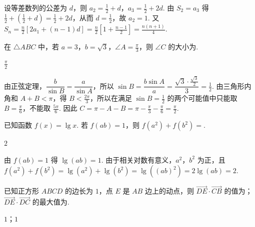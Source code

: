 \begin{solution}
设等差数列的公差为 \(d\)，则 \(a_2=\frac{1}{2}+d\)，\(a_3=\frac{1}{2}+2d\). 由 \(S_2=a_3\) 得
\(\frac{1}{2}+\left(\frac{1}{2}+d\right)=\frac{1}{2}+2d\)，从而 \(d=\frac{1}{2}\)，故 \(a_2=1\). 又
\(S_n=\frac{n}{2}\left[2a_1+(n-1)d\right]=\frac{n}{2}\left[1+\frac{n-1}{2}\right]=\frac{n(n+1)}{4}\).
\end{solution}

\begin{problem}
在 \(\triangle ABC\) 中，若 \(a = 3\)，\(b = \sqrt{3}\)，\(\angle A = \frac{\pi}{3}\)，则 \(\angle C\) 的大小为\fillinblank{}.
\end{problem}

\begin{answer}
\(\frac{\pi}{2}\)
\end{answer}

\begin{solution}
由正弦定理，\(\dfrac{b}{\sin B}=\dfrac{a}{\sin A}\)，所以
\(\sin B=\dfrac{b\sin A}{a}=\dfrac{\sqrt{3}\cdot\frac{\sqrt{3}}{2}}{3}=\frac{1}{2}\).
由三角形内角和 \(A+B<\pi\)，得 \(B<\frac{2\pi}{3}\)，所以在满足 \(\sin B=\frac{1}{2}\) 的两个可能值中只能取 \(B=\frac{\pi}{6}\)，不能取 \(\frac{5\pi}{6}\). 因此
\(C=\pi-A-B=\pi-\frac{\pi}{3}-\frac{\pi}{6}=\frac{\pi}{2}\).
\end{solution}

\begin{problem}
已知函数 \(f(x) = \lg x\). 若 \(f(ab) = 1\)，则 \(f(a^2) + f(b^2)=\)\fillinblank{}.
\end{problem}

\begin{answer}
\(2\)
\end{answer}

\begin{solution}
由 \(f(ab)=1\) 得 \(\lg(ab)=1\). 由于相关对数有意义，\(a^2\)，\(b^2\) 为正，且
\(f(a^2)+f(b^2)=\lg(a^2)+\lg(b^2)=\lg\left((ab)^2\right)=2\lg(ab)=2\).
\end{solution}

\begin{problem}
已知正方形 \(ABCD\) 的边长为 \(1\)，点 \(E\) 是 \(AB\) 边上的动点，则 \(\overrightarrow{DE} \cdot \overrightarrow{CB}\) 的值为\fillinblank{}；\(\overrightarrow{DE} \cdot \overrightarrow{DC}\) 的最大值为\fillinblank{}.
\end{problem}

\begin{answer}
\(1\)；\(1\)
\end{answer}

